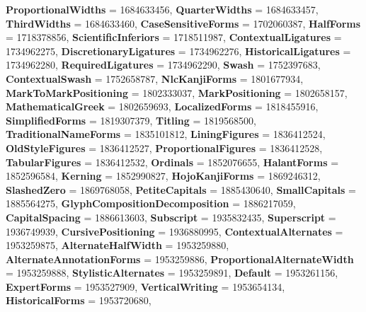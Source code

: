 \begin{DoxyCompactItemize}
\newline
{\bfseries Proportional\+Widths} = 1684633456, 
{\bfseries Quarter\+Widths} = 1684633457, 
{\bfseries Third\+Widths} = 1684633460, 
{\bfseries Case\+Sensitive\+Forms} = 1702060387, 
\newline
{\bfseries Half\+Forms} = 1718378856, 
{\bfseries Scientific\+Inferiors} = 1718511987, 
{\bfseries Contextual\+Ligatures} = 1734962275, 
{\bfseries Discretionary\+Ligatures} = 1734962276, 
\newline
{\bfseries Historical\+Ligatures} = 1734962280, 
{\bfseries Required\+Ligatures} = 1734962290, 
{\bfseries Swash} = 1752397683, 
{\bfseries Contextual\+Swash} = 1752658787, 
\newline
{\bfseries Nlc\+Kanji\+Forms} = 1801677934, 
{\bfseries Mark\+To\+Mark\+Positioning} = 1802333037, 
{\bfseries Mark\+Positioning} = 1802658157, 
{\bfseries Mathematical\+Greek} = 1802659693, 
\newline
{\bfseries Localized\+Forms} = 1818455916, 
{\bfseries Simplified\+Forms} = 1819307379, 
{\bfseries Titling} = 1819568500, 
{\bfseries Traditional\+Name\+Forms} = 1835101812, 
\newline
{\bfseries Lining\+Figures} = 1836412524, 
{\bfseries Old\+Style\+Figures} = 1836412527, 
{\bfseries Proportional\+Figures} = 1836412528, 
{\bfseries Tabular\+Figures} = 1836412532, 
\newline
{\bfseries Ordinals} = 1852076655, 
{\bfseries Halant\+Forms} = 1852596584, 
{\bfseries Kerning} = 1852990827, 
{\bfseries Hojo\+Kanji\+Forms} = 1869246312, 
\newline
{\bfseries Slashed\+Zero} = 1869768058, 
{\bfseries Petite\+Capitals} = 1885430640, 
{\bfseries Small\+Capitals} = 1885564275, 
{\bfseries Glyph\+Composition\+Decomposition} = 1886217059, 
\newline
{\bfseries Capital\+Spacing} = 1886613603, 
{\bfseries Subscript} = 1935832435, 
{\bfseries Superscript} = 1936749939, 
{\bfseries Cursive\+Positioning} = 1936880995, 
\newline
{\bfseries Contextual\+Alternates} = 1953259875, 
{\bfseries Alternate\+Half\+Width} = 1953259880, 
{\bfseries Alternate\+Annotation\+Forms} = 1953259886, 
{\bfseries Proportional\+Alternate\+Width} = 1953259888, 
\newline
{\bfseries Stylistic\+Alternates} = 1953259891, 
{\bfseries Default} = 1953261156, 
{\bfseries Expert\+Forms} = 1953527909, 
{\bfseries Vertical\+Writing} = 1953654134, 
\newline
{\bfseries Historical\+Forms} = 1953720680, 

\end{DoxyCompactItemize}
